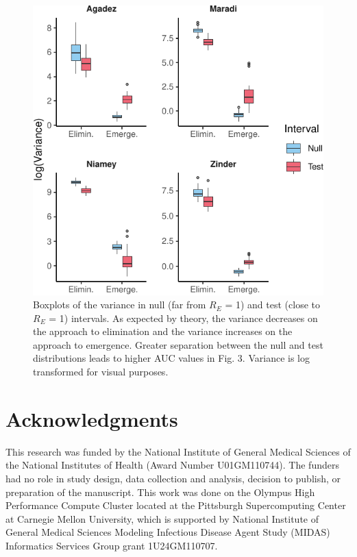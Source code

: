 \documentclass[3p]{elsarticle} %
\makeatletter
\def\maxwidth{\ifdim\Gin@nat@width>\linewidth\linewidth
\else\Gin@nat@width\fi}
\let\Oldincludegraphics\includegraphics
\renewcommand{\includegraphics}[1]{\Oldincludegraphics[width=\maxwidth]{#1}}
\makeatother
\begin{document}
\begin{figure}
\centering
\includegraphics{measles-ews-manuscript_files/figure-latex/var-ews-1.pdf}
\caption{Boxplots of the variance in null (far from \(R_E\) = 1) and
test (close to \(R_E\) = 1) intervals. As expected by theory, the
variance decreases on the approach to elimination and the variance
increases on the approach to emergence. Greater separation between the
null and test distributions leads to higher AUC values in Fig. 3.
Variance is log transformed for visual purposes. \label{var-ex}}
\end{figure}

\hypertarget{acknowledgments}{%
\section{Acknowledgments}\label{acknowledgments}}

This research was funded by the National Institute of General Medical
Sciences of the National Institutes of Health (Award Number
U01GM110744). The funders had no role in study design, data collection
and analysis, decision to publish, or preparation of the manuscript.
This work was done on the Olympus High Performance Compute Cluster
located at the Pittsburgh Supercomputing Center at Carnegie Mellon
University, which is supported by National Institute of General Medical
Sciences Modeling Infectious Disease Agent Study (MIDAS) Informatics
Services Group grant 1U24GM110707.
\end{document}
